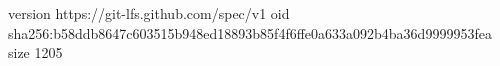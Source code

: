 version https://git-lfs.github.com/spec/v1
oid sha256:b58ddb8647c603515b948ed18893b85f4f6ffe0a633a092b4ba36d9999953fea
size 1205
